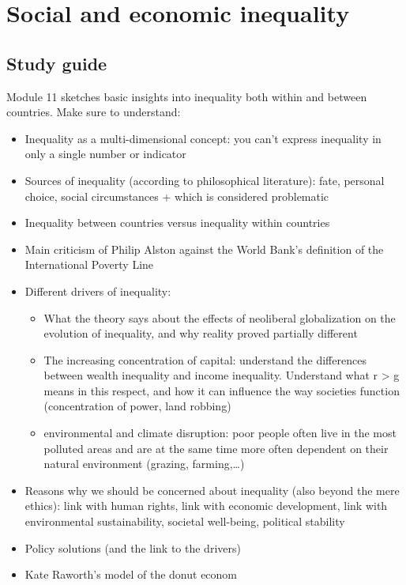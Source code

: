\documentclass[../summary.tex]{subfiles}
\begin{document}
	
	\section{Social and economic inequality}
	
	\subsection{Study guide}
	
	Module 11 sketches basic insights into inequality both within and between countries. Make sure to understand:
	\begin{itemize}
		\item Inequality as a multi-dimensional concept: you can’t express inequality in only a single number or indicator
		\item Sources of inequality (according to philosophical literature): fate, personal choice, social circumstances + which is considered problematic
		\item Inequality between countries versus inequality within countries
		\item Main criticism of Philip Alston against the World Bank’s 
		definition of the International Poverty Line
		\item Different drivers of inequality:
		\begin{itemize}
			\item What the theory says about the effects of neoliberal globalization on the evolution of inequality, and why reality proved partially different
			\item The increasing concentration of capital: understand the differences between wealth inequality and income inequality. Understand what r > g means in this respect, and how it can influence the way societies function (concentration of power, land robbing)
			\item environmental and climate disruption: poor people often live in the most polluted areas and are at the same time more often dependent on their natural environment (grazing, farming,…)
		\end{itemize}
		\item Reasons why we should be concerned about inequality (also beyond the mere ethics): link with human rights, link with economic development, link with environmental sustainability, societal
		well-being, political stability
		\item Policy solutions (and the link to the drivers)
		\item Kate Raworth’s model of the donut econom 
	\end{itemize}
	
\end{document}

